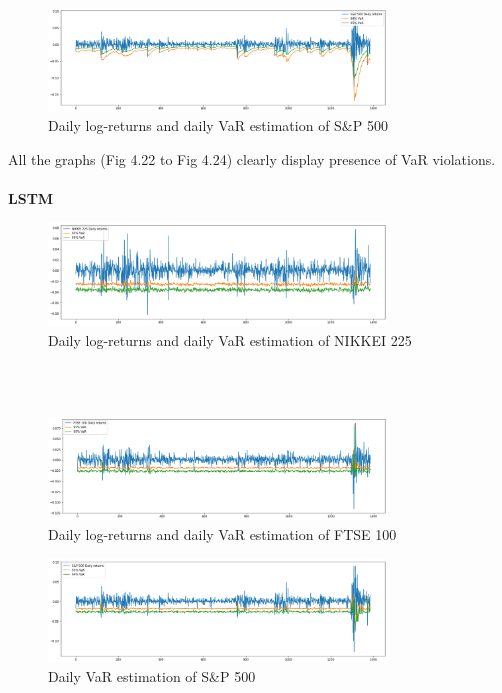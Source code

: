 \documentclass[a4paper,11pt,oneside]{book}
\begin{document}
\begin{figure}[!h]
	\centering
	\includegraphics[width=0.8\textwidth]{figures/GARCHS}
	\caption{Daily log-returns and daily VaR estimation of S\&P 500}
	\label{garchS}
\end{figure}
All the graphs (Fig 4.22 to Fig 4.24) clearly display presence of VaR violations.\\\\


\textbf{LSTM}	
\begin{figure}[!h]
	\centering
	\includegraphics[width=0.8\textwidth]{figures/LSTMN}
	\caption{Daily log-returns and daily VaR estimation of NIKKEI 225}
	\label{LSTMN}
\end{figure}\\\\

\begin{figure}[!h]
	\centering
	\includegraphics[width=0.8\textwidth]{figures/LSTMF}
	\caption{Daily log-returns and daily VaR estimation of FTSE 100}
	\label{LSTMF}
\end{figure}

\begin{figure}[!h]
	\centering
	\includegraphics[width=0.8\textwidth]{figures/LSTMS}
	\caption{Daily VaR estimation of S\&P 500}
	\label{LSTMS}
\end{figure}	
\end{document}
